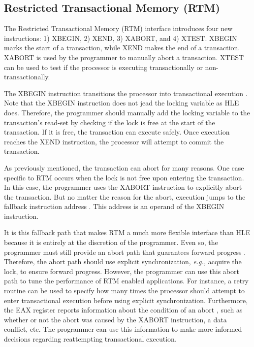 \documentclass[11pt]{book}
\begin{document}

\subsection{Restricted Transactional Memory (RTM)}\label{sec:rtm}

The Restricted Transactional Memory (RTM) interface introduces four new instructions: 1)
XBEGIN, 2) XEND, 3) XABORT, and 4) XTEST.  XBEGIN marks the start of a transaction, while
XEND makes the end of a transaction.  XABORT is used by the programmer to manually abort a
transaction.  XTEST can be used to test if the processor is executing transactionally or
non-transactionally.

The XBEGIN instruction transitions the processor into transactional execution
\cite{intel_prog_ref}.  Note that the XBEGIN instruction does not jead the
locking variable as HLE does.  Therefore, the programmer should manually add the
locking variable to the transaction's read-set by checking if the lock is free
at the start of the transaction.  If it is free, the transaction can execute
safely.  Once execution reaches the XEND instruction, the processor will attempt
to commit the transaction.

As previously mentioned, the transaction can abort for many reasons.  One case specific to
RTM occurs when the lock is not free upon entering the transaction.  In this case, the
programmer uses the XABORT instruction to explicitly abort the transaction.  But no matter
the reason for the abort, execution jumps to the fallback instruction address
\cite{intel_prog_ref}.  This address is an operand of the XBEGIN instruction.

It is this fallback path that makes RTM a much more flexible interface than HLE because it
is entirely at the discretion of the programmer.  Even so, the programmer must still
provide an abort path that guarantees forward progress \cite{intel_prog_ref}.  Therefore,
the abort path should use explicit synchronization, \emph{e.g.,} acquire the lock, to
ensure forward progress. However, the programmer can use this abort path to tune the
performance of RTM enabled applications.  For instance, a retry routine can be used to
specify how many times the processor should attempt to enter transactional execution
before using explicit synchronization.  Furthermore, the EAX register reports information
about the condition of an abort \cite{intel_prog_ref}, such as whether or not the abort
was caused by the XABORT instruction, a data conflict, etc.  The programmer can use this
information to make more informed decisions regarding reattempting transactional
execution.
\end{document}
